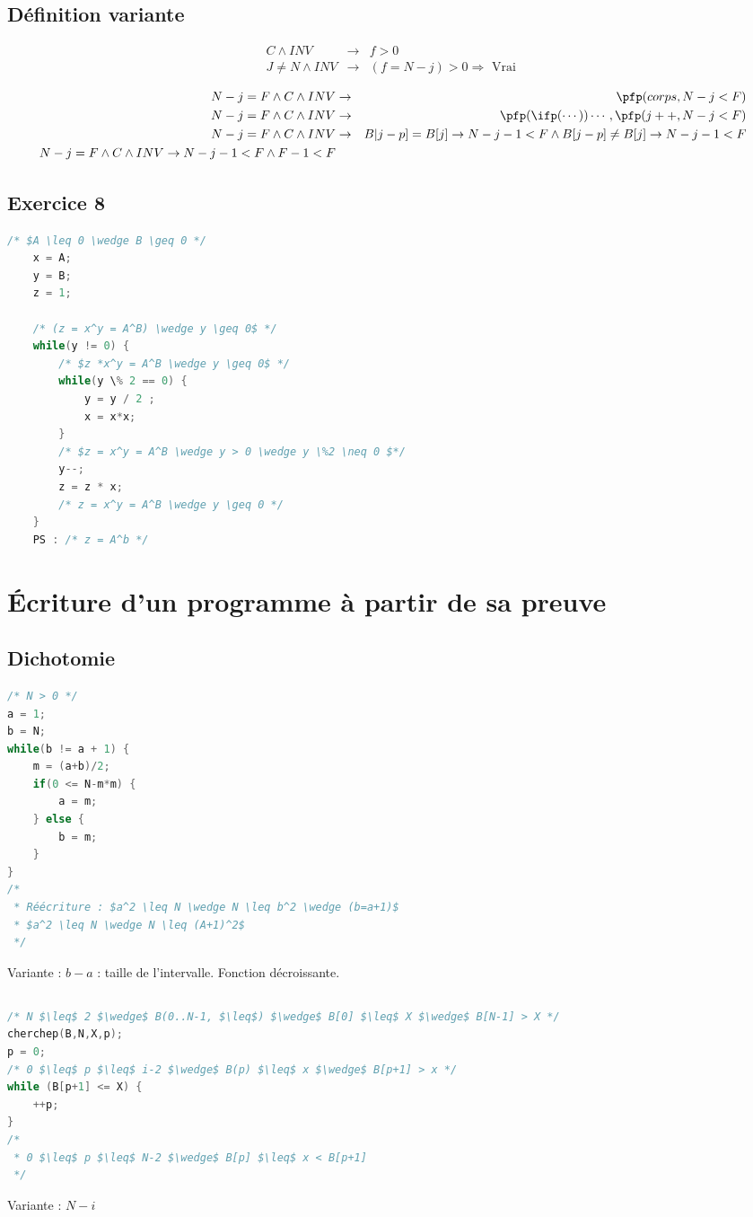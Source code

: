 \subsection{Définition variante}
\begin{eqnarray*}
	C \wedge INV &\rightarrow& f > 0\\
	J \neq N \wedge INV &\rightarrow& (f = N-j) >0 \Rightarrow \textrm{ Vrai }
\end{eqnarray*}

\begin{eqnarray*}
	N-j  =F \wedge C \wedge INV &\rightarrow& \pfp(corps, N-j < F)\\
	N-j  =F \wedge C \wedge INV &\rightarrow& \pfp(\ifp(\cdots))\cdots,\pfp(j++,N-j<F)\\
	N-j  =F \wedge C \wedge INV &\rightarrow& B|j-p] = B[j] \rightarrow N - j -1 < F \wedge B[j-p] \neq B[j] \rightarrow N-j-1 < F\\
	N-j = F \wedge C \wedge INV \rightarrow N-j-1 < F \wedge F-1 < F
\end{eqnarray*}

\subsection{Exercice 8}

\begin{lstlisting}[language=C]
	/* $A \leq 0 \wedge B \geq 0 */
	x = A;
	y = B;
	z = 1;

	/* (z = x^y = A^B) \wedge y \geq 0$ */
	while(y != 0) {
		/* $z *x^y = A^B \wedge y \geq 0$ */
		while(y \% 2 == 0) {
			y = y / 2 ;
			x = x*x;
		}
		/* $z = x^y = A^B \wedge y > 0 \wedge y \%2 \neq 0 $*/
		y--;
		z = z * x;
		/* z = x^y = A^B \wedge y \geq 0 */
	}
	PS : /* z = A^b */

\end{lstlisting}
\section{\'Ecriture d'un programme à partir de sa preuve}
\subsection{Dichotomie}
\begin{lstlisting}[language=C]
/* N > 0 */
a = 1;
b = N;
while(b != a + 1) {
	m = (a+b)/2;
	if(0 <= N-m*m) {
		a = m;
	} else {
		b = m;
	}
}
/*
 * Réécriture : $a^2 \leq N \wedge N \leq b^2 \wedge (b=a+1)$
 * $a^2 \leq N \wedge N \leq (A+1)^2$  
 */
\end{lstlisting}
Variante : $b-a$ : taille de l'intervalle. Fonction décroissante.
\subsection{}

\begin{lstlisting}[language=C]
/* N $\leq$ 2 $\wedge$ B(0..N-1, $\leq$) $\wedge$ B[0] $\leq$ X $\wedge$ B[N-1] > X */
cherchep(B,N,X,p);
p = 0; 
/* 0 $\leq$ p $\leq$ i-2 $\wedge$ B(p) $\leq$ x $\wedge$ B[p+1] > x */ 
while (B[p+1] <= X) {
	++p;
}
/* 
 * 0 $\leq$ p $\leq$ N-2 $\wedge$ B[p] $\leq$ x < B[p+1] 
 */
\end{lstlisting}
Variante : $N - i$

